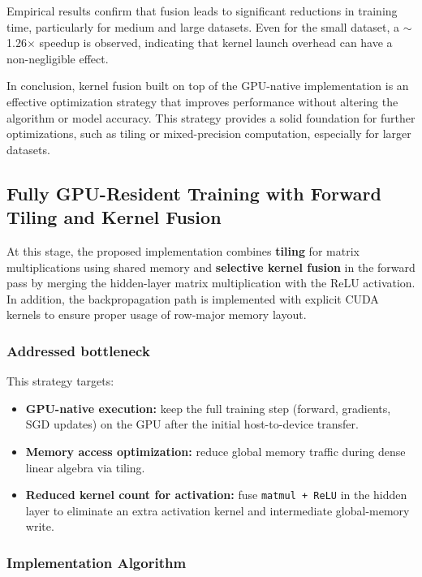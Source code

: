 \documentclass[conference, 12pt]{IEEEtran}
\begin{document}
Empirical results confirm that fusion leads to significant reductions in training time, particularly for medium and large datasets. Even for the small dataset, a $\sim$1.26$\times$ speedup is observed, indicating that kernel launch overhead can have a non-negligible effect.

In conclusion, kernel fusion built on top of the GPU-native implementation is an effective optimization strategy that improves performance without altering the algorithm or model accuracy. This strategy provides a solid foundation for further optimizations, such as tiling or mixed-precision computation, especially for larger datasets.


\subsection{Fully GPU-Resident Training with Forward Tiling and Kernel Fusion}

At this stage, the proposed implementation combines \textbf{tiling} for matrix multiplications using shared memory and \textbf{selective kernel fusion} in the forward pass by merging the hidden-layer matrix multiplication with the ReLU activation. In addition, the backpropagation path is implemented with explicit CUDA kernels to ensure proper usage of row-major memory layout.

\subsubsection{Addressed bottleneck}
This strategy targets:
\begin{itemize}
    \item \textbf{GPU-native execution:} keep the full training step (forward, gradients, SGD updates) on the GPU after the initial host-to-device transfer.
    \item \textbf{Memory access optimization:} reduce global memory traffic during dense linear algebra via tiling.
    \item \textbf{Reduced kernel count for activation:} fuse \texttt{matmul + ReLU} in the hidden layer to eliminate an extra activation kernel and intermediate global-memory write.
\end{itemize}

\subsubsection{Implementation Algorithm}
\end{document}
